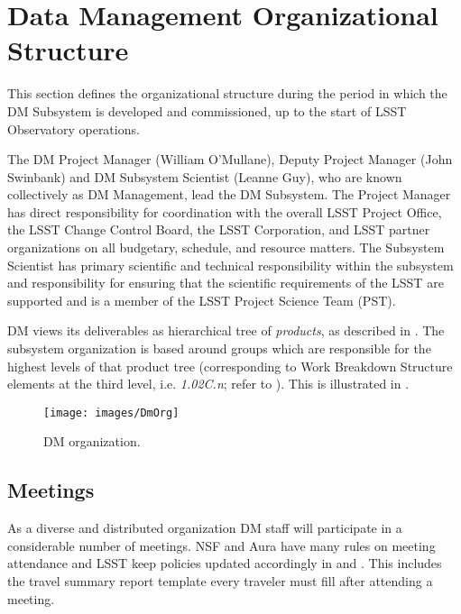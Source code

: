 \section{Data Management Organizational Structure}

This section defines the organizational structure during the period in which the \gls{DM} \gls{Subsystem} is developed and commissioned, up to the start of \gls{LSST} Observatory operations.

The \gls{DM} \gls{Project Manager} (William O'Mullane), Deputy \gls{Project Manager} (John Swinbank) and \gls{DM} \gls{Subsystem Scientist} (Leanne Guy), who are known collectively as \gls{DM} Management, lead the \gls{DM} Subsystem.
The \gls{Project Manager} has direct responsibility for coordination with the overall \gls{LSST} Project Office, the \gls{LSST} \gls{Change Control Board}, the \gls{LSST} Corporation, and \gls{LSST} partner organizations on all budgetary, schedule, and resource matters.
The \gls{Subsystem Scientist} has primary scientific and technical responsibility within the subsystem and responsibility for ensuring that the scientific requirements of the \gls{LSST} are supported and is a member of the \gls{LSST} \gls{Project Science Team} (\gls{PST}).

DM views its deliverables as hierarchical tree of \textit{products}, as described in .
The subsystem organization is based around groups which are responsible for the highest levels of that product tree (corresponding to \gls{Work Breakdown Structure} elements at the third level, i.e. \textit{1.02C.n}; refer to ).
This is illustrated in .

\begin{figure}[htbp]
\begin{center}
 \texttt{[image: images/DmOrg]}
\caption{DM organization. \label{fig:dmorg}}
\end{center}
\end{figure}

\subsection {Meetings} \label{sect:meetings}

As a diverse and distributed organization \gls{DM} staff will participate in a considerable number of meetings.
NSF and Aura have many rules on meeting attendance and \gls{LSST} keep policies updated accordingly in  and . This includes the travel summary report template  every traveler must fill after attending a meeting.

